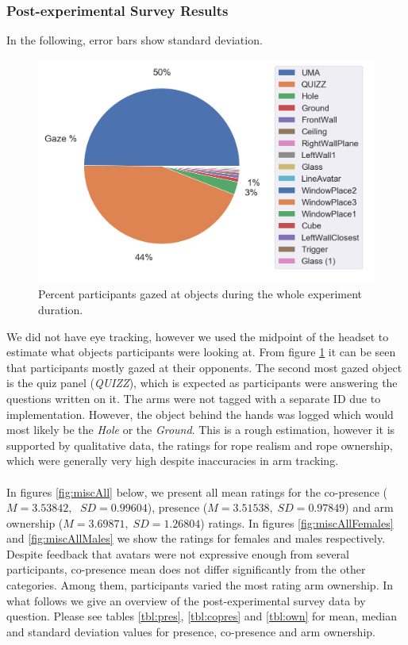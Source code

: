 \clearpage

\subsubsection{Post-experimental Survey Results}

In the following, error bars show standard deviation.
\begin{figure}[H]
 \centering
 \includegraphics[scale=0.5]{Files/Plots/gaze_plots.png}
 \caption{Percent participants gazed at objects during the whole experiment duration. }
\label{fig:gazePie}
\end{figure}
We did not have eye tracking, however we used the midpoint of the headset to estimate what objects participants were looking at. From figure \ref{fig:gazePie} it can be seen that participants mostly gazed at their opponents. The second most gazed object is the quiz panel (\textit{QUIZZ}), which is expected as participants were answering the questions written on it.  The arms were not tagged with a separate ID due to implementation. However, the object behind the hands was logged which would most likely be the \textit{Hole} or the \textit{Ground}. This is a rough estimation, however it is supported by qualitative data, the ratings for rope realism and rope ownership, which were generally very high despite inaccuracies in arm tracking.\\ 
\\
In figures \ref{fig:miscAll} below, we present all mean ratings for the co-presence ($M=3.53842,\;$ $ SD=0.99604 $), presence ($M=3.51538,\; SD=0.97849 $) and arm ownership ($M=3.69871,\; SD=1.26804 $) ratings. In figures \ref{fig:miscAllFemales} and \ref{fig:miscAllMales} we show the ratings for females and males respectively. Despite feedback that avatars were not expressive enough from several participants, co-presence mean does not differ significantly from the other categories. Among them, participants varied the most rating arm ownership. In what follows we give an overview of the post-experimental survey data by question. Please see tables \ref{tbl:pres}, \ref{tbl:copres} and \ref{tbl:own} for mean, median and standard deviation values for presence, co-presence and arm ownership.
